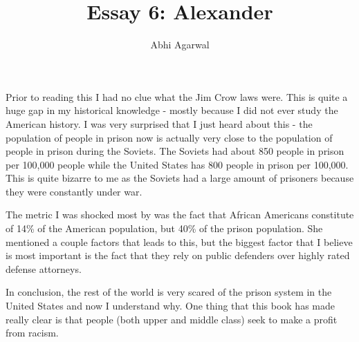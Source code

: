 \documentclass[11pt, oneside]{article}
\title{Essay 6: Alexander}
\author{Abhi Agarwal}
\date{}
\begin{document}
\maketitle

\par Prior to reading this I had no clue what the Jim Crow laws were. This is quite a huge gap in my historical knowledge - mostly because I did not ever study the American history. I was very surprised that I just heard about this - the population of people in prison now is actually very close to the population of people in prison during the Soviets. The Soviets had about 850 people in prison per 100,000 people while the United States has 800 people in prison per 100,000. This is quite bizarre to me as the Soviets had a large amount of prisoners because they were constantly under war. 
\par The metric I was shocked most by was the fact that African Americans constitute of 14\% of the American population, but 40\% of the prison population. She mentioned a couple factors that leads to this, but the biggest factor that I believe is most important is the fact that they rely on public defenders over highly rated defense attorneys. 
\par 

\par In conclusion, the rest of the world is very scared of the prison system in the United States and now I understand why. One thing that this book has made really clear is that people (both upper and middle class) seek to make a profit from racism.
\end{document}
